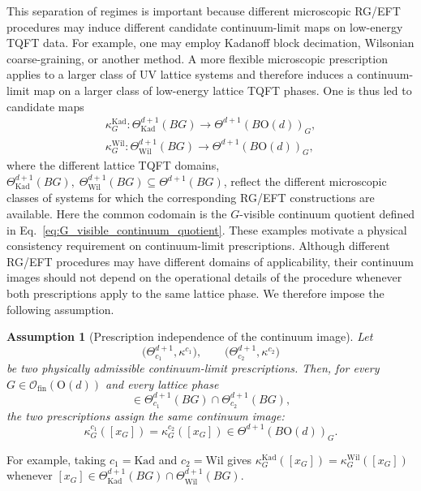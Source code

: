 \documentclass[aps,prx,reprint,superscriptaddress,twocolumn,amsmath,amssymb,amsfonts, nofootinbib]{revtex4-2}
\newcommand{\ofin}{\mathcal{O}_{\text{fin}}}
\theoremstyle{apsstyle}
\newtheorem{assumption}{Assumption}
\begin{document}
This separation of regimes is important because different microscopic RG/EFT procedures may induce different candidate continuum-limit maps on low-energy TQFT data. For example, one may employ Kadanoff block decimation, Wilsonian coarse-graining, or another method. A more flexible microscopic prescription applies to a larger class of UV lattice systems and therefore induces a continuum-limit map on a larger class of low-energy lattice TQFT phases. One is thus led to candidate maps
\begin{gather*}
\kappa_G^{\mathrm{Kad}}:\Theta^{d+1}_{\mathrm{Kad}}(BG)\to \Theta^{d+1}(B\mathrm{O}(d))_G,\\
\kappa_G^{\mathrm{Wil}}:\Theta^{d+1}_{\mathrm{Wil}}(BG)\to \Theta^{d+1}(B\mathrm{O}(d))_G,
\end{gather*}
where the different lattice TQFT domains, $\Theta^{d+1}_{\mathrm{Kad}}(BG),\; \Theta^{d+1}_{\mathrm{Wil}}(BG)\subseteq \Theta^{d+1}(BG)$, reflect the different microscopic classes of systems for which the corresponding RG/EFT constructions are available. Here the common codomain is the $G$-visible continuum quotient defined in Eq.~\eqref{eq:G_visible_continuum_quotient}.
These examples motivate a physical consistency requirement on continuum-limit prescriptions. Although different RG/EFT procedures may have different domains of applicability, their continuum images should not depend on the operational details of the procedure whenever both prescriptions apply to the same lattice phase. We therefore impose the following assumption.

\bigskip 

\begin{assumption}[Prescription independence of the continuum image]
\label{assumption:prescription_independence}
Let
\begin{equation*}
\bigl(\Theta^{d+1}_{c_1},\kappa^{c_1}\bigr),
\qquad
\bigl(\Theta^{d+1}_{c_2},\kappa^{c_2}\bigr)
\end{equation*}
be two physically admissible continuum-limit prescriptions. Then, for every
$G\in\ofin(\mathrm{O}(d))$ and every lattice phase
\begin{equation*}
[x_G]\in
\Theta^{d+1}_{c_1}(BG)
\cap
\Theta^{d+1}_{c_2}(BG),
\end{equation*}
the two prescriptions assign the same continuum image:
\begin{equation}
\kappa^{c_1}_G([x_G])
=
\kappa^{c_2}_G([x_G])
\in
\Theta^{d+1}(B\mathrm{O}(d))_G.
\label{eq:prescription_independence}
\end{equation}
\end{assumption}
\noindent For example, taking $c_1=\mathrm{Kad}$ and $c_2=\mathrm{Wil}$ gives $\kappa_G^{\mathrm{Kad}}([x_G]) = \kappa_G^{\mathrm{Wil}}([x_G])$ whenever $[x_G]\in \Theta^{d+1}_{\mathrm{Kad}} (BG)\cap\Theta^{d+1}_{\mathrm{Wil}}(BG)$.
\end{document}
